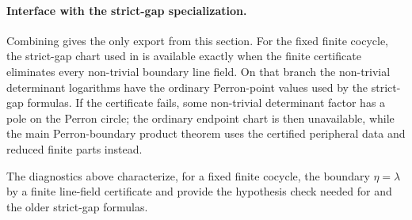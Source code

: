 \paragraph{Interface with the strict-gap specialization.}
Combining
gives the only export from this section.  For the fixed finite cocycle, the
strict-gap chart used in
is available exactly when the finite certificate eliminates every non-trivial
boundary line field.  On that branch the non-trivial determinant logarithms
have the ordinary Perron-point values used by the strict-gap formulas.  If the
certificate fails, some non-trivial determinant factor has a pole on the
Perron circle; the ordinary endpoint chart is then unavailable, while the main
Perron-boundary product theorem uses the certified peripheral data and reduced
finite parts instead.

\begin{remark}
  \label{rem:eta-gap-criteria-scope}
  \label{rem:eta-gap-criteria-boundary-note}
  The diagnostics above characterize, for a fixed finite cocycle, the boundary
  \(\eta=\lambda\) by a finite line-field certificate and provide the hypothesis
  check needed for  and the older strict-gap
  formulas.
\end{remark}


